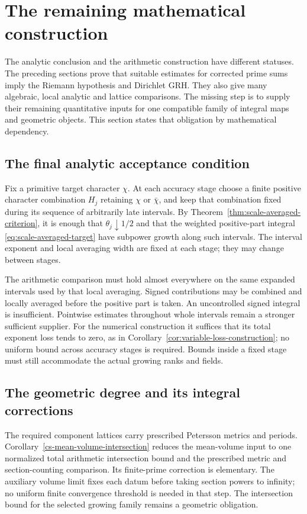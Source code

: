 \section{The remaining mathematical construction}
\label{sec:remaining}

The analytic conclusion and the arithmetic construction have different
statuses. The preceding sections prove that suitable estimates for
corrected prime sums imply the Riemann hypothesis and Dirichlet GRH.
They also give many algebraic, local analytic and lattice comparisons.
The missing step is to supply their remaining quantitative inputs for
one compatible family of integral maps and geometric objects. This
section states that obligation by mathematical dependency.

\subsection{The final analytic acceptance condition}

Fix a primitive target character $\chi$. At each accuracy stage choose
a finite positive character combination $H_j$ retaining $\chi$ or
$\bar\chi$, and keep that combination fixed during its sequence of
arbitrarily late intervals. By
Theorem~\ref{thm:scale-averaged-criterion}, it is enough that
$\theta_j\downarrow1/2$ and that the weighted positive-part integral
\eqref{eq:scale-averaged-target} have subpower growth along such
intervals. The interval exponent and local averaging width are fixed
at each stage; they may change between stages.

The arithmetic comparison must hold almost everywhere on the same
expanded intervals used by that local averaging. Signed contributions
may be combined and locally averaged before the positive part is taken.
An uncontrolled signed integral is insufficient. Pointwise estimates
throughout whole intervals remain a stronger sufficient supplier.
For the numerical construction it suffices that its total exponent
loss tends to zero, as in Corollary~\ref{cor:variable-loss-construction};
no uniform bound across accuracy stages is required. Bounds inside a
fixed stage must still accommodate the actual growing ranks and fields.

\subsection{The geometric degree and its integral corrections}

The required component lattices carry prescribed Petersson metrics
and periods. Corollary~\ref{cs-mean-volume-intersection} reduces
the mean-volume input to one normalized total arithmetic intersection
bound and the prescribed metric and section-counting comparison.
Its finite-prime correction is elementary. The auxiliary volume limit
fixes each datum before taking section powers to infinity; no uniform
finite convergence threshold is needed in that step. The intersection
bound for the selected growing family remains a geometric obligation.

